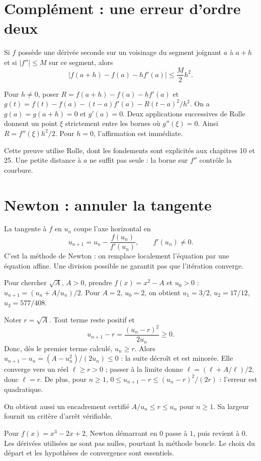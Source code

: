 \documentclass[../cours_1re.tex]{subfiles}
\begin{document}
\section{Complément : une erreur d'ordre deux}
\begin{theoreme}
Si $f$ possède une dérivée seconde sur un voisinage du segment joignant $a$ à $a+h$ et si $|f''|\le M$ sur ce segment, alors
\[
|f(a+h)-f(a)-hf'(a)|\le \frac M2 h^2.
\]
\end{theoreme}
\begin{demonstration}
Pour $h\ne0$, poser $R=f(a+h)-f(a)-hf'(a)$ et
$g(t)=f(t)-f(a)-(t-a)f'(a)-R(t-a)^2/h^2$.
On a $g(a)=g(a+h)=0$ et $g'(a)=0$. Deux applications successives de Rolle donnent un point $\xi$ strictement entre les bornes où $g''(\xi)=0$. Ainsi $R=f''(\xi)h^2/2$. Pour $h=0$, l'affirmation est immédiate.
\end{demonstration}
Cette preuve utilise Rolle, dont les fondements sont explicités aux chapitres 10 et 25. Une petite distance à $a$ ne suffit pas seule : la borne sur $f''$ contrôle la courbure.
\section{Newton : annuler la tangente}
La tangente à $f$ en $u_n$ coupe l'axe horizontal en
\[
u_{n+1}=u_n-\frac{f(u_n)}{f'(u_n)},\qquad f'(u_n)\ne0.
\]
C'est la méthode de Newton : on remplace localement l'équation par une équation affine. Une division possible ne garantit pas que l'itération converge.
\begin{exemple}
Pour chercher $\sqrt A$, $A>0$, prendre $f(x)=x^2-A$ et $u_0>0$ :
$u_{n+1}=(u_n+A/u_n)/2$.
Pour $A=2$, $u_0=2$, on obtient $u_1=3/2$, $u_2=17/12$, $u_3=577/408$.
\end{exemple}
\begin{demonstration}
Noter $r=\sqrt A$. Tout terme reste positif et
\[
u_{n+1}-r=\frac{(u_n-r)^2}{2u_n}\ge0.
\]
Donc, dès le premier terme calculé, $u_n\ge r$. Alors
$u_{n+1}-u_n=(A-u_n^2)/(2u_n)\le0$ : la suite décroît et est minorée. Elle converge vers un réel $\ell\ge r>0$ ; passer à la limite donne $\ell=(\ell+A/\ell)/2$, donc $\ell=r$.
De plus, pour $n\ge1$, $0\le u_{n+1}-r\le(u_n-r)^2/(2r)$ : l'erreur est quadratique.
\end{demonstration}
On obtient aussi un encadrement certifié $A/u_n\le r\le u_n$ pour $n\ge1$. Sa largeur fournit un critère d'arrêt vérifiable.
\begin{attention}
Pour $f(x)=x^3-2x+2$, Newton démarrant en $0$ passe à $1$, puis revient à $0$. Les dérivées utilisées ne sont pas nulles, pourtant la méthode boucle. Le choix du départ et les hypothèses de convergence sont essentiels.
\end{attention}
\end{document}
